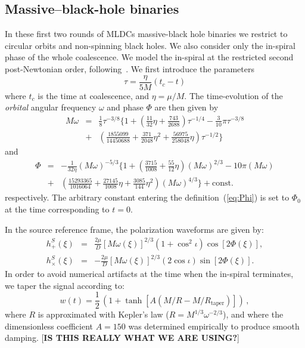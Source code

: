 \documentclass[12pt]{iopart}
\def\be{\begin{equation}}
\def\ee{\end{equation}}
\def\bea{\begin{eqnarray}}
\def\eea{\end{eqnarray}}
\begin{document}
\subsection{Massive--black-hole binaries}

In these first two rounds of MLDCs massive-black hole binaries we restrict to circular orbits and non-spinning black holes. We also consider only the in-spiral phase of the whole coalescence. We model the in-spiral at the restricted second post-Newtonian order, following~\cite{Blanchet,DIS}. We first introduce the parameters
\be
\tau =  \frac{\eta}{5M}(t_c - t)
\ee
where $t_c$ is the time at coalescence, and $\eta = \mu/M$. The time-evolution of the \emph{orbital} angular frequency $\omega$ and phase $\Phi$ are then given by
\bea
M\omega &=& \frac{1}{8} \tau^{-3/8}\Biggl\{ 1 + \left( \frac{11}{32}\eta + \frac{743}{2688}\right) 
\tau^{-1/4} - \frac{3}{10}\pi\tau^{-3/8} \nonumber \\
& + & \left(\frac{1855099}{14450688} + \frac{371}{2048}\eta^2 
+ \frac{56975}{258048}\eta\right)
\tau^{-1/2}  \Biggr\}
\label{fr}
\eea
and
\bea
\Phi &=& -\frac{1}{32\eta}(M\omega)^{-5/3}\Biggl\{ 1 + \left( \frac{3715}{1008} + \frac{55}{12}\eta\right)
(M\omega)^{2/3} - 10\pi(M\omega)  \nonumber \\
&+&  \left( \frac{15293365}{1016064} + \frac{27145}{1008}\eta + \frac{3085}{144}\eta^2\right)
(M\omega)^{4/3}\Biggr\} + \mathrm{const.}
\label{eq:Phi}
\eea
respectively. The arbitrary constant entering the definition~(\ref{eq:Phi}) is set to $\Phi_0$ at the time corresponding to $t = 0$. 

In the source reference frame, the polarization waveforms are given by:
%
\begin{eqnarray}
h^S_{+}(\xi) &=& \frac{2\mu}{D}[M\omega(\xi)]^{2/3}(1+\cos^2 \iota)\cos [2\Phi(\xi)], \\
h^S_{\times}(\xi) &=& -\frac{2\mu}{D}[M\omega(\xi)]^{2/3}(2 \cos \iota) \sin [2\Phi(\xi)]. \nonumber
\end{eqnarray}
%
In order to avoid numerical artifacts at the time when the in-spiral terminates, we taper the signal according to:
%
\begin{equation}
w(t) = \frac{1}{2}\,\left( 1 + \tanh\left[A (M/R - M/R_\mathrm{taper})\right] \right)\,,
\end{equation}
%
where $R$ is approximated with Kepler's law ($R = M^{1/3} \omega^{-2/3}$), and
where the dimensionless coefficient $A = 150$ was determined empirically to produce smooth damping.
[{\bf IS THIS REALLY WHAT WE ARE USING?}]
\end{document}
